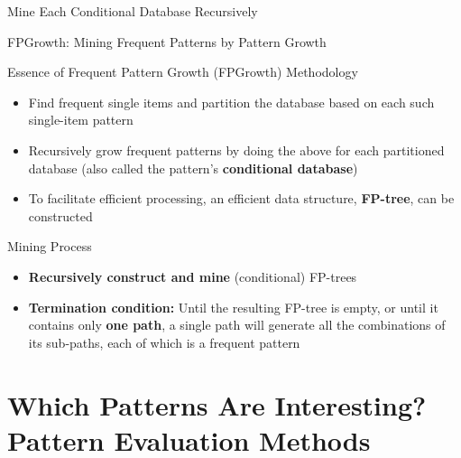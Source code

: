 \documentclass[aspectratio=169, 11pt]{beamer}
\begin{document}
\begin{frame}{Mine Each Conditional Database Recursively}
\end{frame}

\begin{frame}{FPGrowth: Mining Frequent Patterns by Pattern Growth}
    \begin{block}{Essence of Frequent Pattern Growth (FPGrowth) Methodology}
        \begin{itemize}
            \item Find frequent single items and partition the database based on each such single-item pattern
            \item Recursively grow frequent patterns by doing the above for each partitioned database (also called the pattern's \textbf{conditional database})
            \item To facilitate efficient processing, an efficient data structure, \textbf{FP-tree}, can be constructed
        \end{itemize}
    \end{block}
    \vspace{2mm}
    \begin{alertblock}{Mining Process}
        \begin{itemize}
            \item \textbf{Recursively construct and mine} (conditional) FP-trees
            \item \textbf{Termination condition:} Until the resulting FP-tree is empty, or until it contains only \textbf{one path}, a single path will generate all the combinations of its sub-paths, each of which is a frequent pattern
        \end{itemize}
    \end{alertblock}
\end{frame}

\section{Which Patterns Are Interesting? Pattern Evaluation Methods}
\end{document}
